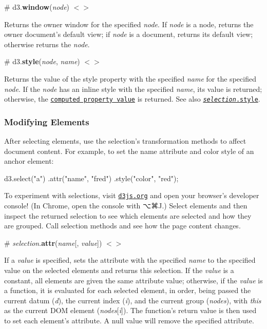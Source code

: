 \label{_window}%
\# d3.{\bfseries window}({\itshape node}) \href{https://github.com/d3/d3-selection/blob/master/src/window.js}{\tt $<$$>$}

Returns the owner window for the specified {\itshape node}. If {\itshape node} is a node, returns the owner document’s default view; if {\itshape node} is a document, returns its default view; otherwise returns the {\itshape node}.

\label{_style}%
\# d3.{\bfseries style}({\itshape node}, {\itshape name}) \href{https://github.com/d3/d3-selection/blob/master/src/selection/style.js#L32}{\tt $<$$>$}

Returns the value of the style property with the specified {\itshape name} for the specified {\itshape node}. If the {\itshape node} has an inline style with the specified {\itshape name}, its value is returned; otherwise, the \href{https://developer.mozilla.org/en-US/docs/Web/CSS/computed_value}{\tt computed property value} is returned. See also \href{#selection_style}{\tt {\itshape selection}.style}.

\subsubsection*{Modifying Elements}

After selecting elements, use the selection’s transformation methods to affect document content. For example, to set the name attribute and color style of an anchor element\+:


\begin{DoxyCode}
d3.select("a")
    .attr("name", "fred")
    .style("color", "red");
\end{DoxyCode}


To experiment with selections, visit \href{https://d3js.org}{\tt d3js.\+org} and open your browser’s developer console! (In Chrome, open the console with ⌥⌘J.) Select elements and then inspect the returned selection to see which elements are selected and how they are grouped. Call selection methods and see how the page content changes.

\label{_selection_attr}%
\# {\itshape selection}.{\bfseries attr}({\itshape name}\mbox{[}, {\itshape value}\mbox{]}) \href{https://github.com/d3/d3-selection/blob/master/src/selection/attr.js}{\tt $<$$>$}

If a {\itshape value} is specified, sets the attribute with the specified {\itshape name} to the specified value on the selected elements and returns this selection. If the {\itshape value} is a constant, all elements are given the same attribute value; otherwise, if the {\itshape value} is a function, it is evaluated for each selected element, in order, being passed the current datum ({\itshape d}), the current index ({\itshape i}), and the current group ({\itshape nodes}), with {\itshape this} as the current D\+OM element ({\itshape nodes}\mbox{[}{\itshape i}\mbox{]}). The function’s return value is then used to set each element’s attribute. A null value will remove the specified attribute.


